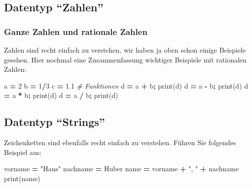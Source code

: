 \documentclass[
  oneside]{book}
\newenvironment{Shaded}{\begin{snugshade}}{\end{snugshade}}
\newcommand{\BuiltInTok}[1]{#1}
\newcommand{\CommentTok}[1]{\textcolor[rgb]{0.56,0.35,0.01}{\textit{#1}}}
\newcommand{\DecValTok}[1]{\textcolor[rgb]{0.00,0.00,0.81}{#1}}
\newcommand{\FloatTok}[1]{\textcolor[rgb]{0.00,0.00,0.81}{#1}}
\newcommand{\NormalTok}[1]{#1}
\newcommand{\OperatorTok}[1]{\textcolor[rgb]{0.81,0.36,0.00}{\textbf{#1}}}
\newcommand{\StringTok}[1]{\textcolor[rgb]{0.31,0.60,0.02}{#1}}
\begin{document}
\hypertarget{datentyp-zahlen}{%
\subsection{Datentyp ``Zahlen''}\label{datentyp-zahlen}}

\hypertarget{ganze-zahlen-und-rationale-zahlen}{%
\subsubsection{Ganze Zahlen und rationale Zahlen}\label{ganze-zahlen-und-rationale-zahlen}}

Zahlen sind recht einfach zu verstehen, wir haben ja oben schon einige Beispiele gesehen. Hier nochmal eine Zusammenfassung wichtiger Beispiele mit rationalen Zahlen: 

\begin{Shaded}
\begin{Highlighting}[]
\NormalTok{a }\OperatorTok{=} \DecValTok{2}
\NormalTok{b }\OperatorTok{=} \DecValTok{1}\OperatorTok{/}\DecValTok{3}
\NormalTok{c }\OperatorTok{=} \FloatTok{1.1}
\CommentTok{\# Funktionen}
\NormalTok{d }\OperatorTok{=}\NormalTok{ a }\OperatorTok{+}\NormalTok{ b}\OperatorTok{;} \BuiltInTok{print}\NormalTok{(d)}
\NormalTok{d }\OperatorTok{=}\NormalTok{ a }\OperatorTok{{-}}\NormalTok{ b}\OperatorTok{;} \BuiltInTok{print}\NormalTok{(d)}
\NormalTok{d }\OperatorTok{=}\NormalTok{ a }\OperatorTok{*}\NormalTok{ b}\OperatorTok{;} \BuiltInTok{print}\NormalTok{(d)}
\NormalTok{d }\OperatorTok{=}\NormalTok{ a }\OperatorTok{/}\NormalTok{ b}\OperatorTok{;} \BuiltInTok{print}\NormalTok{(d)}
\end{Highlighting}
\end{Shaded}

\hypertarget{datentyp-strings}{%
\subsection{Datentyp ``Strings''}\label{datentyp-strings}}

Zeichenketten sind ebenfalls recht einfach zu verstehen. Führen Sie folgendes Beispiel aus:

\begin{Shaded}
\begin{Highlighting}[]
\NormalTok{vorname }\OperatorTok{=} \StringTok{"Hans"}
\NormalTok{nachname }\OperatorTok{=} \StringTok{\textquotesingle{}Huber\textquotesingle{}}
\NormalTok{name }\OperatorTok{=}\NormalTok{ vorname }\OperatorTok{+} \StringTok{", "} \OperatorTok{+}\NormalTok{ nachname}
\BuiltInTok{print}\NormalTok{(name)}
\end{Highlighting}
\end{Shaded}
\end{document}
